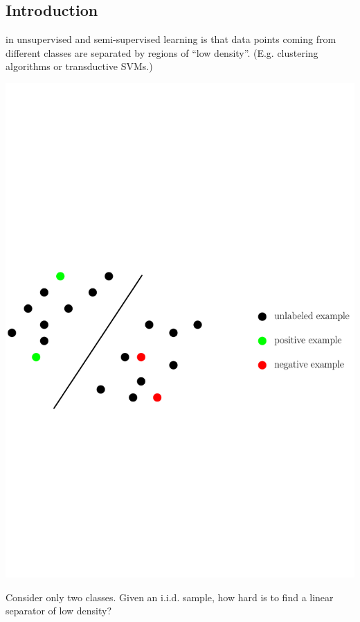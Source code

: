 \documentclass[largefonts,landscape]{sciposter}
\begin{document}
\setlength{\columnsep}{6cm}
\begin{multicols}{3}

\section*{Introduction}

 in unsupervised and semi-supervised learning
is that data points coming from different classes are separated by regions
of ``low density''. (E.g. clustering algorithms or transductive SVMs.)

\begin{center}
\includegraphics[scale=1.5]{tsvm}
\end{center}

Consider only two classes. Given an i.i.d. sample, how hard is to find a linear
separator of low density?


\end{multicols}
\end{document}
